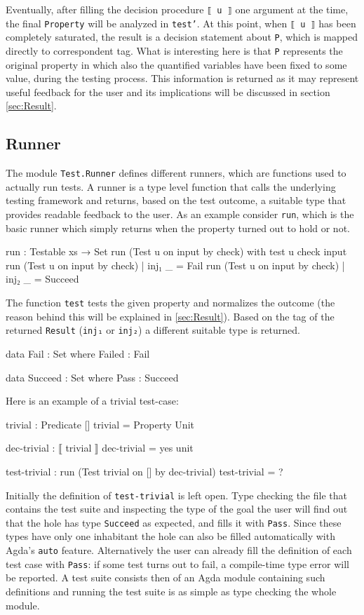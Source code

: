 \documentclass[10pt,a4paper]{article}
\begin{document}
Eventually, after filling the decision procedure \texttt{⟦ u ⟧} one argument at the time, the final \texttt{Property} will be analyzed in \texttt{test'}.
At this point, when \texttt{⟦ u ⟧} has been completely saturated, the result is a decision statement about \texttt{P}, which is mapped directly to correspondent tag.
What is interesting here is that \texttt{P} represents the original property in which also the quantified variables have been fixed to some value, during the testing process. 
This information is returned as it may represent useful feedback for the user and its implications will be discussed in section \ref{sec:Result}.

\subsection{Runner}
The module \texttt{Test.Runner} defines different runners, which are functions used to actually run tests.
A runner is a type level function that calls the underlying testing framework and returns, based on the test outcome, a suitable type that provides readable feedback to the user.
As an example consider \texttt{run}, which is the basic runner which simply returns when the property turned out to hold or not.
\begin{code}
run : Testable xs → Set
run (Test u on input by check) with test u check input
run (Test u on input by check) | inj₁ _ = Fail
run (Test u on input by check) | inj₂ _ = Succeed
\end{code}
The function \texttt{test} tests the given property and normalizes the outcome (the reason behind this will be explained in \ref{sec:Result}).
Based on the tag of the returned \texttt{Result} (\texttt{inj₁} or \texttt{inj₂}) a different suitable type is returned.
\begin{code}
data Fail : Set where
  Failed : Fail

data Succeed : Set where
  Pass : Succeed
\end{code}
Here is an example of a trivial test-case:
\begin{code}
trivial : Predicate []
trivial = Property Unit

dec-trivial : ⟦ trivial ⟧
dec-trivial = yes unit

test-trivial : run (Test trivial on [] by dec-trivial)
test-trivial = ?
\end{code}
Initially the definition of \texttt{test-trivial} is left open.
Type checking the file that contains the test suite and inspecting the type of the goal the user will find out that the hole has type \texttt{Succeed} as expected, and fills it with \texttt{Pass}.
Since these types have only one inhabitant the hole can also be filled automatically with Agda's \texttt{auto} feature.
Alternatively the user can already fill the definition of each test case with \texttt{Pass}: if some test turns out to fail, a compile-time type error will be reported.
A test suite consists then of an Agda module containing such definitions and running the test suite is as simple as type checking the whole module.
\end{document}
